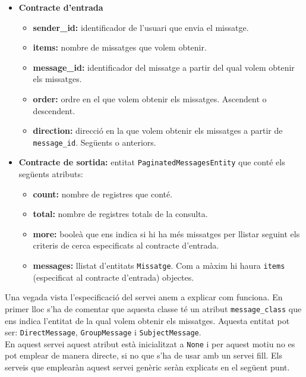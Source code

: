 \begin{itemize}
			\begin{itemize}
					\item \textbf{Contracte d'entrada}
						\begin{itemize}
							\item \textbf{sender\_id:} identificador de l'usuari que envia el missatge.
							\item \textbf{items:} nombre de missatges que volem obtenir.
							\item \textbf{message\_id:} identificador del missatge a partir del qual volem obtenir els missatges.
							\item \textbf{order:} ordre en el que volem obtenir els missatges. Ascendent o descendent.
							\item \textbf{direction:} direcció en la que volem obtenir els missatges a partir de \texttt{message\_id}. Següents o anteriors.
						\end{itemize}
					\item \textbf{Contracte de sortida:} entitat \texttt{PaginatedMessagesEntity} que conté els següents atributs:
					\begin{itemize}
						\item \textbf{count:} nombre de registres que conté.
						\item \textbf{total:} nombre de registres totals de la consulta.
						\item \textbf{more:} booleà que ens indica si hi ha més missatges per llistar seguint els criteris de cerca especificats al contracte d'entrada.
						\item \textbf{messages:} llistat d'entitats \texttt{Missatge}. Com a màxim hi haura \texttt{items} (especificat al contracte d'entrada) objectes.
					\end{itemize}
			\end{itemize}
			
			Una vegada vista l'especificació del servei anem a explicar com funciona. En primer lloc s'ha de comentar que aquesta classe té un atribut \texttt{message\_class} que ens indica l'entitat de la qual volem obtenir els missatges. Aquesta entitat pot ser: \texttt{DirectMessage}, \texttt{GroupMessage} i \texttt{SubjectMessage}.\\
			
			En aquest servei aquest atribut està inicialitzat a \texttt{None} i per aquest motiu no es pot emplear de manera directe, si no que s'ha de usar amb un servei fill. Els serveis que emplearàn aquest servei genèric seràn explicats en el següent punt.\\
			

\end{itemize}
